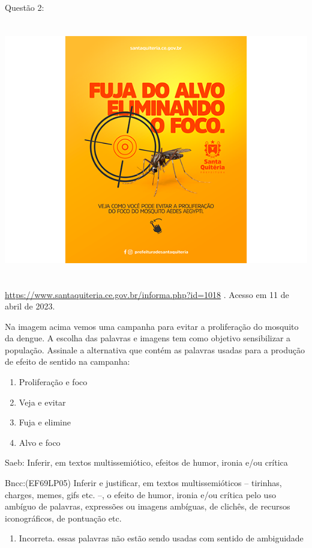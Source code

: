 {Questão 2:

\includegraphics[width=5.90551in,height=4.43056in]{./imgSAEB_7_POR/media/image6.png}

\href{https://www.santaquiteria.ce.gov.br/informa.php?id=1018}{\uline{https://www.santaquiteria.ce.gov.br/informa.php?id=1018}}
. Acesso em 11 de abril de 2023.

Na imagem acima vemos uma campanha para evitar a proliferação do
mosquito da dengue. A escolha das palavras e imagens tem como objetivo
sensibilizar a população. Assinale a alternativa que contém as palavras
usadas para a produção de efeito de sentido na campanha:

\begin{enumerate}
\def\labelenumi{\alph{enumi})}
\item
  Proliferação e foco
\item
  Veja e evitar
\item
  Fuja e elimine
\item
  Alvo e foco
\end{enumerate}

Saeb: Inferir, em textos multissemiótico, efeitos de humor, ironia e/ou
crítica

Bncc:(EF69LP05) Inferir e justificar, em textos multissemióticos --
tirinhas, charges, memes, gifs etc. --, o efeito de humor, ironia e/ou
crítica pelo uso ambíguo de palavras, expressões ou imagens ambíguas, de
clichês, de recursos iconográficos, de pontuação etc.

\begin{enumerate}
\def\labelenumi{\arabic{enumi}.}
\tightlist
\item
  Incorreta. essas palavras não estão sendo usadas com sentido de
  ambiguidade
\end{enumerate}

}
